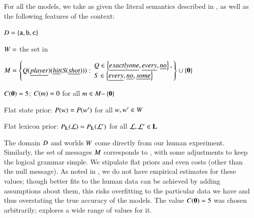 \documentclass[leqno,12pt]{article}
\begin{document}
For all the models, we take as given the literal semantics described
in , as well as the following features of the
context:
%
\begin{examples}
\item\label{expmod}
  \begin{examples}
  \item $D = \left\{ \texttt{a}, \texttt{b}, \texttt{c} \right\}$
  \item $W = $ the set in 
  \item\label{expformulae} $\Messages =
    \setlength{\arraycolsep}{2pt}
    \set{
      Q(\word{player})(\word{hit}(S\negthinspace(\word{shot}))) :
      \begin{array}{l}        
        Q \in \set{\word{exactly one}, \word{every}, \word{no}}, \\
        S \in \set{\word{every}, \word{no}, \word{some}}
      \end{array}} \cup \set{\nullmsg}$
  \item $C(\mathbf{0}) = 5$; $C(m) = 0$ for all $m \in M{-}\left\{ \mathbf{0} \right\}$  
  \item Flat state prior: $P(w) = P(w')$ for all $w, w' \in W$
  \item Flat lexicon prior: $P_{\mathbf{L}}(\mathcal{L}) = P_{\mathbf{L}}(\mathcal{L}')$ for all $\mathcal{L}, \mathcal{L}' \in \mathbf{L}$
  \end{examples}
\end{examples}

The domain $D$ and worlds $W$ come directly from our human
experiment. Similarly, the set of messages $M$ corresponds to
, with some adjustments to keep the logical grammar
simple. We stipulate flat priors and even costs (other than the null
message). As noted in , we do not have empirical
estimates for these values; though better fits to the human data can
be achieved by adding assumptions about them, this risks overfitting
to the particular data we have and thus overstating the true accuracy
of the models. The value $C(\mathbf{0}) = 5$ was chosen
arbitrarily;  explores a wide range of
values for it.
\end{document}
